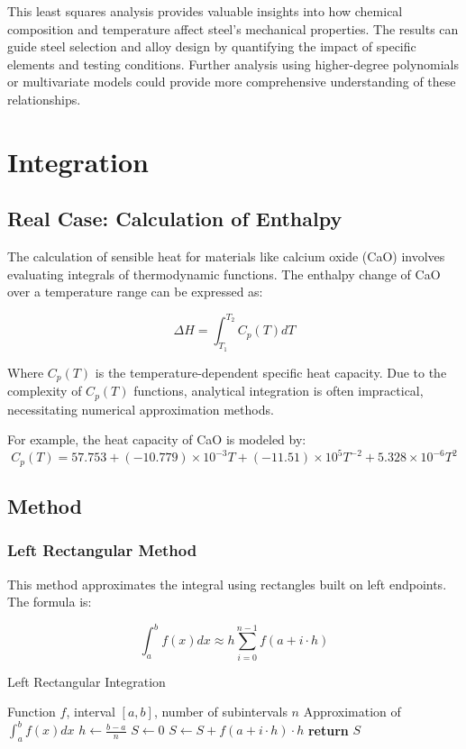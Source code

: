 \documentclass[10pt]{article}
\begin{document}
This least squares analysis provides valuable insights into how chemical composition and temperature affect steel's mechanical properties. The results can guide steel selection and alloy design by quantifying the impact of specific elements and testing conditions. Further analysis using higher-degree polynomials or multivariate models could provide more comprehensive understanding of these relationships.



\section{Integration}
\subsection{Real Case: Calculation of Enthalpy}
The calculation of sensible heat for materials like calcium oxide (CaO) involves evaluating integrals of thermodynamic functions. The enthalpy change of CaO over a temperature range can be expressed as:

\begin{equation}
\Delta H = \int_{T_1}^{T_2} C_p(T) dT
\end{equation}

Where \(C_p(T)\) is the temperature-dependent specific heat capacity. Due to the complexity of \(C_p(T)\) functions, analytical integration is often impractical, necessitating numerical approximation methods.

For example, the heat capacity of CaO is modeled by:
\begin{equation}
C_p(T) = 57.753 + (-10.779)\times10^{-3}T + (-11.51)\times10^{5}T^{-2} + 5.328\times10^{-6}T^2
\end{equation}

\subsection{Method}
\subsubsection{Left Rectangular Method}
This method approximates the integral using rectangles built on left endpoints. The formula is:

\begin{equation}
\int_{a}^{b} f(x)dx \approx h\sum_{i=0}^{n-1} f(a + i\cdot h)
\end{equation}

\begin{algorithm}[H]
\caption{Left Rectangular Integration}
\begin{algorithmic}[1]
\Require Function $f$, interval $[a, b]$, number of subintervals $n$
\Ensure Approximation of $\int_{a}^{b} f(x) dx$
\State $h \gets \frac{b - a}{n}$
\State $S \gets 0$
    \State $S \gets S + f(a + i \cdot h) \cdot h$
\EndFor
\State \textbf{return} $S$
\end{algorithmic}
\end{algorithm}
\end{document}
